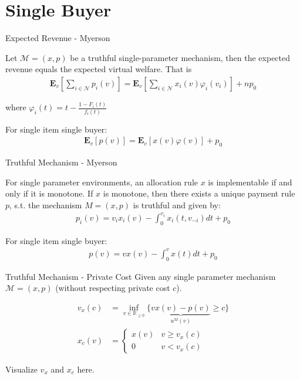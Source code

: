 \documentclass{beamer}
\begin{document}
\section{Single Buyer}

\begin{frame}{Expected Revenue - Myerson}
  \begin{lemma}
    Let $\mathcal{M}=(x,p)$ be a truthful single-parameter mechanism, then the expected revenue equals the expected virtual welfare. That is
    \begin{align*}
      \mathbf{E}_v\left[\sum_{i \in \mathcal{N}}p_i(v)\right]
      = \mathbf{E}_v\left[\sum_{i \in \mathcal{N}}x_i(v)\varphi_i(v_i)\right] + n p_0
    \end{align*}

    where $\varphi_i(t) = t - \frac{1 - F_i(t)}{f_i(t)}$
  \end{lemma}

  For single item single buyer:
  \begin{align*}
    \mathbf{E}_v\left[p(v)\right]
    = \mathbf{E}_v\left[x(v)\varphi(v)\right] + p_0
  \end{align*}
\end{frame}

\begin{frame}{Truthful Mechanism - Myerson}
  \begin{lemma}
    For single parameter environments, an allocation rule $x$ is implementable if and only if it is monotone.
    If $x$ is monotone, then there exists a unique payment rule $p$, s.t. the mechanism $M=(x,p)$ is truthful
    and given by:
    \begin{align*}
      p_i(v) = v_i x_i(v) - \int_0^{v_i} x_i(t,v_{-i})dt + p_0
    \end{align*}
  \end{lemma}

  For single item single buyer:
  \begin{align*}
    p(v) = v x(v) - \int_0^v x(t) dt + p_0
  \end{align*}
\end{frame}

\begin{frame}{Truthful Mechanism - Private Cost}
  Given any single parameter mechanism $\mathcal{M} = (x,p)$ (without respecting private cost $c$).

  \begin{align*}
    v_x(c) & = \inf_{v \in \mathbb{R}_{\geq 0}} \{\underbrace{v x(v) - p(v)}_{u^M(v)} \geq c\} \\
    x_c(v) & = \begin{cases}
                 x(v) & v \geq v_x(c) \\
                 0    & v < v_x(c)
               \end{cases}
  \end{align*}

  Visualize $v_x$ and $x_c$ here.
\end{frame}
\end{document}
